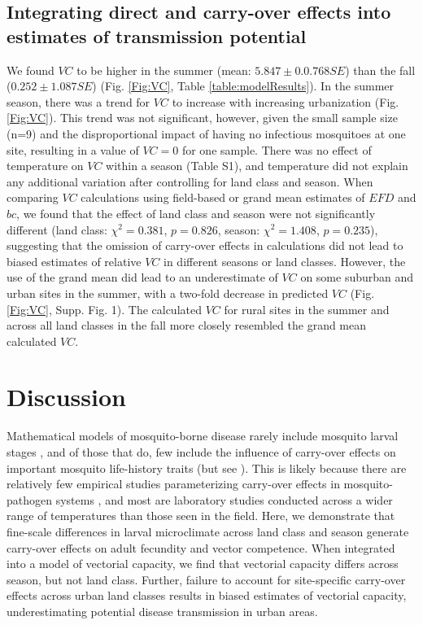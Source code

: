 \documentclass[doublespacing, linenumbers]{bmcart}
\begin{document}
\subsection*{Integrating direct and carry-over effects into estimates of transmission potential}

We found $VC$ to be higher in the summer (mean: $5.847 \pm 0.0.768 SE$) than the fall ($0.252 \pm 1.087 SE$) (Fig. \ref{Fig:VC}, Table \ref{table:modelResults}).
In the summer season, there was a trend for $VC$ to increase with increasing urbanization (Fig. \ref{Fig:VC}).
This trend was not significant, however, given the small sample size (n=9) and the disproportional impact of having no infectious mosquitoes at one site, resulting in a value of $VC=0$ for one sample.
There was no effect of temperature on $VC$ within a season (Table S1), and temperature did not explain any additional variation after controlling for land class and season.
When comparing $VC$ calculations using field-based or grand mean estimates of $EFD$ and $bc$, we found that the effect of land class and season were not significantly different (land class: $\chi^2=0.381$, $p=0.826$, season: $\chi^2=1.408$, $p=0.235$), suggesting that the omission of carry-over effects in calculations did not lead to biased estimates of relative $VC$ in different seasons or land classes.
However, the use of the grand mean did lead to an underestimate of $VC$ on some suburban and urban sites in the summer, with a two-fold decrease in predicted $VC$ (Fig. \ref{Fig:VC}, Supp. Fig. 1).
The calculated $VC$ for rural sites in the summer and across all land classes in the fall more closely resembled the grand mean calculated $VC$.

\section*{Discussion}

Mathematical models of mosquito-borne disease rarely include mosquito larval stages \cite{reiner2013}, and of those that do, few include the influence of carry-over effects on important mosquito life-history traits (but see \cite{roux2015a}).
This is likely because there are relatively few empirical studies parameterizing carry-over effects in mosquito-pathogen systems \cite{parham2015}, and most are laboratory studies conducted across a wider range of temperatures than those seen in the field.
Here, we demonstrate that fine-scale differences in larval microclimate across land class and season generate carry-over effects on adult fecundity and vector competence.
When integrated into a model of vectorial capacity, we find that vectorial capacity differs across season, but not land class.
Further, failure to account for site-specific carry-over effects across urban land classes results in biased estimates of vectorial capacity, underestimating potential disease transmission in urban areas.
\end{document}
